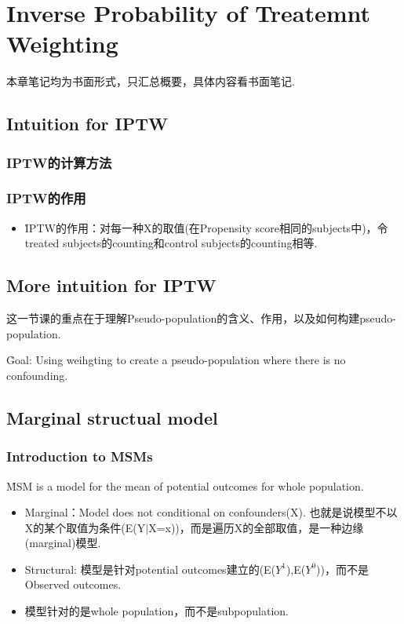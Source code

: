 \chapter{Inverse Probability of Treatemnt Weighting}
本章笔记均为书面形式，只汇总概要，具体内容看书面笔记.

\section{Intuition for IPTW}
\subsection{IPTW的计算方法}
\subsection{IPTW的作用}
\begin{itemize}
	\item \r{IPTW的作用：}对每一种X的取值(在Propensity score相同的subjects中)，令treated subjects的counting和control subjects的counting相等.
\end{itemize}
	
	
\section{More intuition for IPTW}
这一节课的重点在于理解Pseudo-population的含义、作用，以及如何构建pseudo-population.

\r{Goal:} Using weihgting to create a pseudo-population where there is no confounding.

\section{Marginal structual model}
\subsection{Introduction to MSMs}
\r{MSM is a model for the mean of potential outcomes for whole population.}
\begin{itemize}
	\item Marginal：Model does not conditional on confounders(X). 也就是说模型不以X的某个取值为条件(E(Y$|$X=x))，而是遍历X的全部取值，是一种边缘(marginal)模型.
	\item Structural: 模型是针对potential outcomes建立的(E($Y^1$),E($Y^0$))，而不是Observed outcomes. 
	\item 模型针对的是whole population，而不是subpopulation.
\end{itemize}

